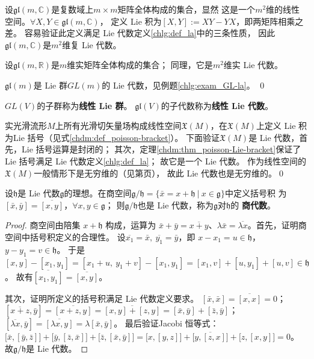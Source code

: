 \begin{example}\label{chlg:exm_GL-a}
    设$\mathfrak{gl}(m,\mathbb{C})$是复数域上$m\times m$矩阵全体构成的集合，显然
    这是一个$m^2$维的线性空间。$\forall X,Y\in \mathfrak{gl}(m,\mathbb{C})$，
    定义 Lie 积为$[X,Y]:=XY-YX$，即两矩阵相乘之差。
    容易验证此定义满足 Lie 代数定义\ref{chlg:def_la}中的三条性质，
    因此$\mathfrak{gl}(m,\mathbb{C})$是$m^2$维复 Lie 代数。

    设$\mathfrak{gl}(m,\mathbb{R})$是$m$维实矩阵全体构成的集合；
    同理，它是$m^2$维实 Lie 代数。

    $\mathfrak{gl}(m)$是 Lie 群$GL(m)$的 Lie 代数，见例题\ref{chlg:exam_GL-la}。 \qed
\end{example}

\begin{definition}
    $GL(V)$的子群称为\textbf{线性 Lie 群}。
    $\mathfrak{gl}(V)$的子代数称为\textbf{线性 Lie 代数}。
\end{definition}

\begin{example}\label{chlg:exm_LAXM}
    实光滑流形$M$上所有光滑切矢量场构成线性空间$\mathfrak{X}(M)$，在$\mathfrak{X}(M)$上定义
     Lie 积为Lie 括号（见式\eqref{chdm:def_poisson-bracket}）。
    下面验证$\mathfrak{X}(M)$是 Lie 代数，首先，Lie 括号运算是封闭的；
    其次，定理\ref{chdm:thm_poisson-Lie-bracket}保证了Lie 括号满足 Lie 代数定义\ref{chlg:def_la}；
    故它是一个 Lie 代数。
    作为线性空间的$\mathfrak{X}(M)$一般情形下是无穷维的（见第\pageref{chdm:eqn_rnumtimesv}页），
    故此 Lie 代数也是无穷维的。\qed
\end{example}

\begin{proposition}
    设$\mathfrak{h}$是 Lie 代数$\mathfrak{g}$的理想。在{商空间}$\mathfrak{g}/\mathfrak{h}=
    \{\bar{x}=x+\mathfrak{h} \ |\ x\in \mathfrak{g} \}$中定义括号积
    为$[\bar{x},\bar{y}]=\overline{[x,y]}$，$\forall x,y \in \mathfrak{g}$；
    则$\mathfrak{g}/\mathfrak{h}$也是 Lie 代数，称为$\mathfrak{g}$对$\mathfrak{h}$的
    \textbf{商代数}。
\end{proposition}
\begin{proof}
    商空间由陪集 $x+\mathfrak h$ 构成，运算为 $\bar x+\bar y=\overline{x+y}$、$\lambda\bar x=\overline{\lambda x}$。首先，证明商空间中括号积定义的合理性。
    设$\overline{x_1}=\bar{x},\ \overline{y_1}=\bar{y}$，即
    $x-x_1=u\in \mathfrak{h}$，$y-y_1=v\in \mathfrak{h}$。
    于是$[x,y]-[x_1,y_1]=[x_1+u,\  y_1+v]-[x_1,y_1]=[x_1,v]+[u,y_1]+[u,v]\in \mathfrak{h}$。
    故有$\overline{[x_1,y_1]}=\overline{[x,y]}$。

    其次，证明所定义的括号积满足 Lie 代数定义要求。
    $[\bar{x},\bar{x}]=\overline{[x,x]}=0$；
    $[\overline{x+z},\bar{y}]=\overline{[x+z,y]}=\overline{[x,y]+[z,y]}
    =[\bar{x},\bar{y}]+[\bar{z},\bar{y}]$；
    $[\overline{\lambda x},\bar{y}]=\overline{[\lambda x,y]}=\lambda[\bar{x},\bar{y}]$。
    最后验证Jacobi 恒等式：
    $\bigl[\bar{x},[\bar{y},\bar{z}]\bigr]+\bigl[\bar{y},[\bar{z},\bar{x}]\bigr]+\bigl[\bar{z},[\bar{x},\bar{y}]\bigr]
    =\overline{\bigl[x,[y,z]\bigr]+\bigl[y,[z,x]\bigr]+\bigl[z,[x,y]\bigr]}=0$。
    故$\mathfrak{g}/\mathfrak{h}$是 Lie 代数。
\end{proof}

